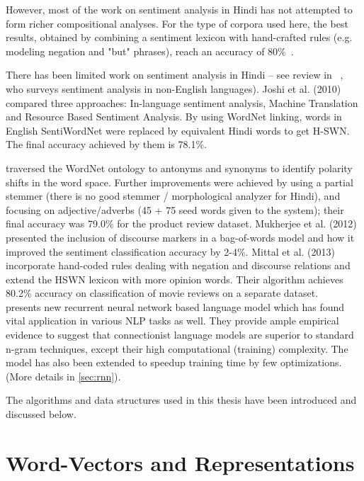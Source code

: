 However, most of the work on sentiment analysis in Hindi has not attempted to form richer compositional analyses.   For the type of corpora used here, the best results, obtained by combining a sentiment lexicon with hand-crafted rules (e.g. modeling negation and "but" phrases), reach an accuracy of 80\%~\cite{Mittal:13}.

There has been limited work on sentiment analysis in Hindi -- see review in
~\cite{Medagoda:13}, who surveys sentiment analysis in non-English languages). Joshi et al. (2010) compared three approaches: In-language sentiment
analysis, Machine Translation and Resource Based Sentiment Analysis. By using WordNet linking, words in English SentiWordNet were replaced by equivalent Hindi words to get H-SWN. The final accuracy achieved by them is 78.1\%.

\cite{Bakliwal:12}
traversed the WordNet ontology to antonyms and synonyms 
to identify polarity shifts in the word space. Further
improvements were achieved by using a partial stemmer (there is no good
stemmer / morphological analyzer for Hindi), and focusing on 
adjective/adverbs (45 + 75 seed words given to the system); their 
final accuracy was 79.0\% for the product review dataset. 
Mukherjee et al. (2012) presented the inclusion of discourse markers in a bag-of-words model and how it improved the sentiment classification accuracy by 2-4\%.  %
Mittal et al. (2013) incorporate hand-coded rules dealing with negation and discourse relations and extend the HSWN lexicon with more opinion words.  Their algorithm achieves  80.2\%
accuracy on classification of movie reviews on a separate dataset.\\

\cite{Mikolov:10} presents new recurrent neural network based language model which has found vital application in various NLP tasks as well. They provide ample empirical evidence to suggest that connectionist language models are superior to standard n-gram techniques, except their high computational (training) complexity. The model has also been extended to speedup training time by few optimizations.(More details in \ref{sec:rnn}).

The algorithms and data structures used in this thesis have been introduced and discussed below.
\section{Word-Vectors and Representations}

